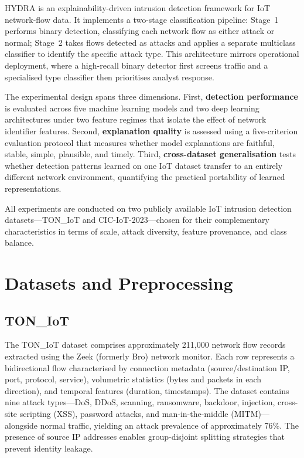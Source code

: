 \documentclass[12pt,a4paper]{report}
\begin{document}
HYDRA is an explainability-driven intrusion detection framework for IoT network-flow data. It implements a two-stage classification pipeline: Stage~1 performs binary detection, classifying each network flow as either attack or normal; Stage~2 takes flows detected as attacks and applies a separate multiclass classifier to identify the specific attack type. This architecture mirrors operational deployment, where a high-recall binary detector first screens traffic and a specialised type classifier then prioritises analyst response.

The experimental design spans three dimensions. First, \textbf{detection performance} is evaluated across five machine learning models and two deep learning architectures under two feature regimes that isolate the effect of network identifier features. Second, \textbf{explanation quality} is assessed using a five-criterion evaluation protocol that measures whether model explanations are faithful, stable, simple, plausible, and timely. Third, \textbf{cross-dataset generalisation} tests whether detection patterns learned on one IoT dataset transfer to an entirely different network environment, quantifying the practical portability of learned representations.

All experiments are conducted on two publicly available IoT intrusion detection datasets---TON\_IoT and CIC-IoT-2023---chosen for their complementary characteristics in terms of scale, attack diversity, feature provenance, and class balance.

\section{Datasets and Preprocessing}
\label{sec:datasets}

\subsection{TON\_IoT}
\label{sec:toniot-meth}

The TON\_IoT dataset \citep{moustafa2021} comprises approximately 211,000 network flow records extracted using the Zeek (formerly Bro) network monitor. Each row represents a bidirectional flow characterised by connection metadata (source/destination IP, port, protocol, service), volumetric statistics (bytes and packets in each direction), and temporal features (duration, timestamps). The dataset contains nine attack types---DoS, DDoS, scanning, ransomware, backdoor, injection, cross-site scripting (XSS), password attacks, and man-in-the-middle (MITM)---alongside normal traffic, yielding an attack prevalence of approximately 76\%. The presence of source IP addresses enables group-disjoint splitting strategies that prevent identity leakage.
\end{document}
